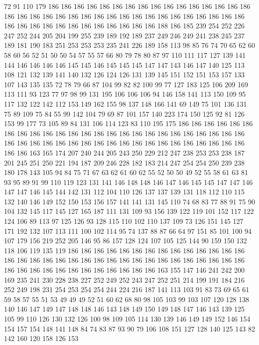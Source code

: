 72 91 110 179 186 186 186 186 186 186 186 186 186 186 186 186 186 186 186 186
186 186 186 186 186 186 186 186 186 186 186 186 186 186 186 186 186 186 186 186
186 186 186 186 186 186 186 186 186 186 186 188 186 185 239 254 252 226 247 252
244 205 204 199 255 239 189 192 189 237 249 246 249 241 238 245 237 189 181 190
183 251 253 253 253 235 241 226 189 158 113 98 85 76 74 70 65 62 60 58
60 56 52 51 50 50 54 57 55 57 66 80 79 78 80 87 97 110 111 117
127 139 141 144 146 146 146 146 145 145 146 145 145 145 147 147 143 146 147 140
125 113 108 121 132 139 141 140 132 126 124 126 131 139 145 151 152 151 153 157
133 107 143 135 135 72 78 79 66 87 104 99 82 82 100 99 77 127 183 125
106 209 169 113 111 93 123 77 97 98 99 131 195 106 106 106 94 146 158 141
113 150 109 95 117 132 122 142 112 153 149 162 155 98 137 148 166 141 69 149
75 101 136 131 75 89 109 75 84 55 99 142 104 79 69 87 101 157 140 223
174 150 125 92 81 126 153 99 177 73 105 89 84 131 106 114 123 83 110 195
175 186 186 186 186 186 186 186 186 186 186 186 186 186 186 186 186 186 186 186
186 186 186 186 186 186 186 186 186 186 186 186 186 186 186 186 186 186 186 186
186 186 186 186 186 186 186 163 165 174 207 240 244 205 243 250 229 212 247 238
253 253 238 187 201 245 251 250 221 194 187 209 246 228 182 183 214 247 254 254
250 239 238 180 178 143 105 94 84 75 71 67 63 62 61 60 62 55 52 50
50 49 52 55 58 61 63 81 93 95 89 91 99 110 119 123 131 141 146 148
148 146 147 146 145 145 147 147 146 147 147 146 145 144 142 131 112 104 110 126
137 137 139 131 118 112 110 115 132 140 146 149 152 150 153 156 157 141 141 131
145 110 74 68 83 77 88 91 75 90 104 132 145 117 145 127 165 187 111 131
109 93 156 139 122 119 101 152 117 122 124 106 89 113 97 125 126 93 128 115
110 102 110 137 109 73 126 151 145 127 171 192 132 107 113 111 100 102 114 95
74 137 88 87 66 64 97 151 85 101 100 94 107 179 156 219 252 205 146 95
86 157 128 124 107 105 125 144 90 159 150 132 118 106 119 135 119 186 186 186
186 186 186 186 186 186 186 186 186 186 186 186 186 186 186 186 186 186 186 186
186 186 186 186 186 186 186 186 186 186 186 186 186 186 186 186 186 186 186 186
186 186 163 155 147 146 241 242 200 169 235 241 230 228 238 227 252 249 252 243
247 252 251 214 199 191 184 216 252 249 198 231 254 253 254 254 244 224 216 187
141 113 103 91 83 73 69 65 61 59 58 57 55 51 53 49 49 49 52 51
60 62 68 80 98 105 103 99 103 107 120 128 138 140 146 147 149 147 148 148
146 143 148 149 150 149 148 147 146 143 139 125 105 99 110 126 130 132 126 100
98 109 105 114 130 139 146 149 149 152 146 154 154 157 154 148 141 148 84 74
83 87 93 90 79 106 108 151 127 128 140 125 143 82 142 160 120 158 126 153
